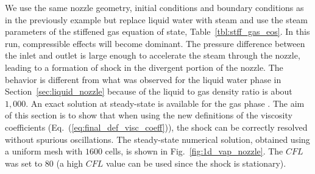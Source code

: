 \documentclass[preprint,10pt]{elsarticle}
\newcommand{\eqt}[1]{Eq.~(\ref{#1})}                     %
\newcommand{\fig}[1]{Fig.~\ref{#1}}                      %
\newcommand{\tbl}[1]{Table~\ref{#1}}                     %
\newcommand{\sct}[1]{Section~\ref{#1}}                   %
\begin{document}
We use the same nozzle geometry, initial conditions and boundary conditions as in the previously example but replace liquid water with steam and use the steam parameters of the stiffened gas equation of state, \tbl{tbl:stff_gas_eos}. In this run, compressible effects will become dominant. 
The pressure difference between the inlet and outlet is large enough to accelerate the steam through the nozzle, leading to a formation of shock in the divergent portion of the nozzle. The behavior is different from what was observed for the liquid water phase in \sct{sec:liquid_nozzle} because of the liquid to gas density ratio is about $1,000$. An exact solution at steady-state is available for the gas phase \cite{nozzle_exact}. The aim of this section is to show that when using the new definitions of the viscosity coefficients (\eqt{eq:final_def_visc_coeff}), the shock can be correctly resolved without spurious oscillations. The steady-state numerical solution, obtained using a uniform mesh with $1600$ cells, is shown in \fig{fig:1d_vap_nozzle}. The $CFL$ was set to $80$ (a high $CFL$ value can be used since the shock is stationary).
\end{document}
